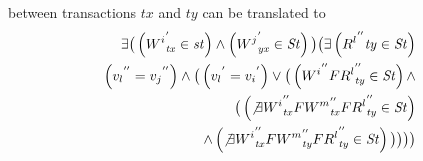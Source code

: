\documentclass{sig-alternate-05-2015}
\begin{document}
    between transactions $\mathit{tx}$ and $\mathit{ty}$ can be translated to \begin{align}\label{eqn:ww}
\begin{split}
 \exists \big( %
 \left( {W^i}^{'}_\mathit{tx} \in \mathit{st} \right)
   \wedge \left( {W^j}^{'}_\mathit{yx}  \in  \mathit{St} \right)  \big)
   \big( %
  \exists %
  \left( { R^l}^{''}\mathit{ty} \in \mathit{St} \right) %
   \\ \left( {v_l}^{''} = {v_j}^{''} \right)
   \wedge
   \big( \left(  {v_l}^{'} = {v_i}^{'} \right) \vee
  \big( \left( {W^i}^{''} F { R^l}^{''}_\mathit{ty} \in \mathit{St} \right) \wedge \\
   \big( \left(  \not\exists {W^i}^{''}_\mathit{tx} F {W^m}^{''}_\mathit{tx} F { R^l}^{''}_\mathit{ty} \in \mathit{St} \right)  \\
  \wedge  \left(  \not\exists {W^i}^{''}_\mathit{tx} F {W^m}^{''}_\mathit{ty} F { R^l}^{''}_\mathit{ty} \in \mathit{St} \right) \big) \big) \big) \big)
   \end{split}
   \end{align}
\end{document}
